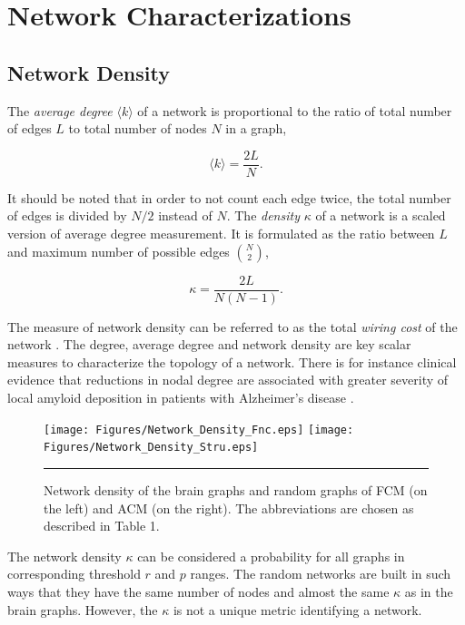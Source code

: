 \section{Network Characterizations}

\subsection{Network Density}
The \textit{average degree} $\langle k \rangle$ of a network is proportional to the ratio of total number of edges $L$ to total number of nodes $N$ in a graph, 

\begin{equation}
\langle k \rangle = \frac{2L}{N}.
\end{equation}

It should be noted that in order to not count each edge twice, the total number of edges is divided by $N/2$ instead of $N$. The \textit{density} $\kappa$ of a network is a scaled version of average degree measurement. It is formulated as the ratio between $L$ and maximum number of possible edges $\binom{N}{2}$,

\begin{equation}
\kappa = \frac{2L}{N(N-1)}.
\end{equation}	

The measure of network density can be referred to as the total \textit{wiring cost} of the network \citep{RUB10}. The degree, average degree and network density are key scalar measures to characterize the topology of a network. There is for instance clinical evidence that reductions in nodal degree are associated with greater severity of local amyloid deposition in patients with Alzheimer's disease \citep{XYZ2009}. 

\begin{figure}[htbp]
  \centering
	\texttt{[image: Figures/Network\_Density\_Fnc.eps]}
	\texttt{[image: Figures/Network\_Density\_Stru.eps]}  
    \rule{35em}{0.5pt}
    \caption[Network Density]{Network density of the brain graphs and random graphs of FCM (on the left) and ACM (on the right). The abbreviations are chosen as described in Table 1.}
  \label{fig:Network Density}
\end{figure}


The network density $\kappa$ can be considered a probability for all graphs in corresponding threshold $r$ and $p$ ranges. The random networks are built in such ways that they have the same number of nodes and almost the same $\kappa$ as in the brain graphs. However, the $\kappa$ is not a unique metric identifying a network.

